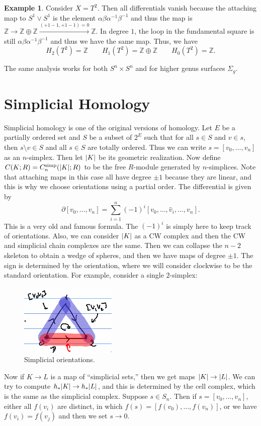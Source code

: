 \documentclass[leqno, openany]{memoir}
\theoremstyle{definition}
\newtheorem{exm}[thm]{Example}
\theoremstyle{remark}
\theoremstyle{plain}
\theoremstyle{definition}
\theoremstyle{remark}
\newcommand{\Z}{\mathbb{Z}}
\newcommand{\mr}[1]{\mathrm{#1}}
\newcommand{\wh}[1]{\widehat{#1}}
\begin{document}
\begin{exm}
    Consider $X = T^2$. Then all differentials vanish because the attaching map to $S^1 \vee S^1$ is the element $\alpha \beta \alpha^{-1} \beta^{-1}$ and thus the map is $\Z \to \Z \oplus \Z \xrightarrow{(+1-1, +1-1) = 0} \Z$. In degree $1$, the loop in the fundamental square is still $\alpha \beta \alpha^{-1} \beta^{-1}$ and thus we have the same map. Thus, we have
    \[ H_2(T^2) = \Z \qquad H_1(T^2) = \Z \oplus \Z \qquad H_0(T^2) = \Z. \]
\end{exm}

The same analysis works for both $S^n \times S^n$ and for higher genus surfaces $\Sigma_g$.

\section{Simplicial Homology}%
\label{sec:simplicial_homology}

Simplicial homology is one of the original versions of homology. Let $E$ be a partially ordered set and $S$ be a subset of $2^E$ such that for all $s \in S$ and $v \in s$, then $s \setminus v \in S$ and all $s \in S$ are totally ordered. Thus we can write $s = [v_0, \ldots, v_n]$ as an $n$-simplex. Then let $\abs{K}$ be its geometric realization. Now define $C(K; R) = C_n^{\mr{simp}}(\abs{K}; R)$ to be the free $R$-module generated by $n$-simplices. Note that attaching maps in this case all have degree $\pm 1$ because they are linear, and this is why we choose orientations using a partial order. The differential is given by
\[ \partial [v_0, \ldots, v_n] = \sum_{i=1}^n {(-1)}^i [v_0, \ldots, \wh{v}_i, \ldots, v_n]. \]
This is a very old and famous formula. The $(-1)^i$ is simply here to keep track of orientations. Also, we can consider $\abs{K}$ as a CW complex and then the CW and simplicial chain complexes are the same. Then we can collapse the $n-2$ skeleton to obtain a wedge of spheres, and then we have maps of degree $\pm 1$. The sign is determined by the orientation, where we will consider clockwise to be the standard orientation. For example, consider a single $2$-simplex:
\begin{figure}[H]
    \centering
    \includegraphics[scale=1]{simporient.png}
    \caption{Simplicial orientations.}%
    \label{fig:simporient}
\end{figure}
Now if $K \to L$ is a map of ``simplicial sets,'' then we get maps $\abs{K} \to \abs{L}$. We can try to compute $h_*\abs{K} \to h_*\abs{L}$, and this is determined by the cell complex, which is the same as the simplicial complex. Suppose $s \in S_n$. Then if $s = [v_0, \ldots, v_n]$, either all $f(v_i)$ are distinct, in which $f(s) = [f(v_0), \ldots, f(v_n)]$, or we have $f(v_i) = f(v_j)$ and then we set $s \to 0$.
\end{document}
